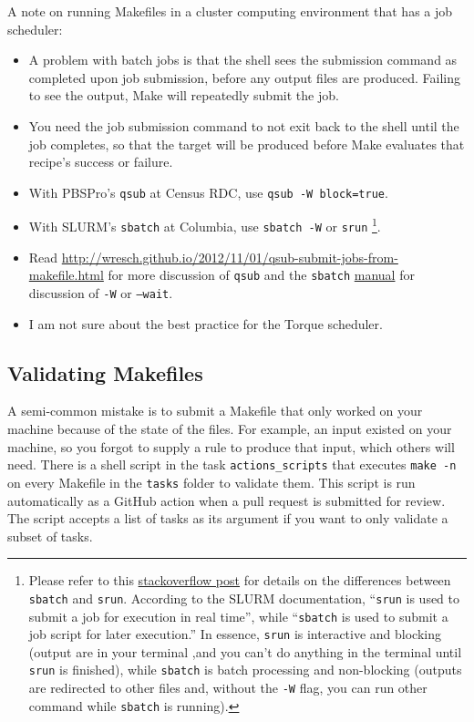 A note on running Makefiles in a cluster computing environment that has a job scheduler:
\begin{itemize}
	\item A problem with batch jobs is that the shell sees the submission command as completed upon job submission, before any output files are produced.
	Failing to see the output, Make will repeatedly submit the job.
	\item You need the job submission command to not exit back to the shell until the job completes, so that the target will be produced before Make evaluates that recipe's success or failure.
	\item With PBSPro's \texttt{qsub} at Census RDC, use \texttt{qsub -W block=true}.
	\item With SLURM's \texttt{sbatch} at Columbia, use \texttt{sbatch -W} or \texttt{srun}%
		\footnote{
			Please refer to this \href{https://stackoverflow.com/questions/43767866/slurm-srun-vs-sbatch-and-their-parameters}{stackoverflow post}
				for details on the differences
				between \texttt{sbatch} and \texttt{srun}.
			According to the SLURM documentation,
				``\texttt{srun} is used to submit a job for execution in real time'',
				while ``\texttt{sbatch} is used to submit a job script for later execution.''
			In essence, \texttt{srun} is interactive and blocking
				(output are in your terminal ,and
				you can't do anything in the terminal until \texttt{srun} is finished),
				while \texttt{sbatch} is batch processing and non-blocking
				(outputs are redirected to other files and,
				without the \texttt{-W} flag,
				you can run other command while \texttt{sbatch} is running).
		}.
	\item Read \url{http://wresch.github.io/2012/11/01/qsub-submit-jobs-from-makefile.html} for more discussion of \texttt{qsub} and the \texttt{sbatch} \href{https://slurm.schedmd.com/sbatch.html}{manual} for discussion of \texttt{-W} or \texttt{--wait}.
	\item I am not sure about the best practice for the Torque scheduler.
\end{itemize}

\subsection{Validating Makefiles}

A semi-common mistake is to submit a Makefile that only worked on your machine because of the state of the files.
For example, an input existed on your machine, so you forgot to supply a rule to produce that input,
which others will need.
There is a shell script in the task \texttt{actions\_scripts} that executes \texttt{make -n} on every Makefile in the \texttt{tasks} folder to validate them.
This script is run automatically as a GitHub action when a pull request is submitted for review.
The script accepts a list of tasks as its argument if you want to only validate a subset of tasks.
